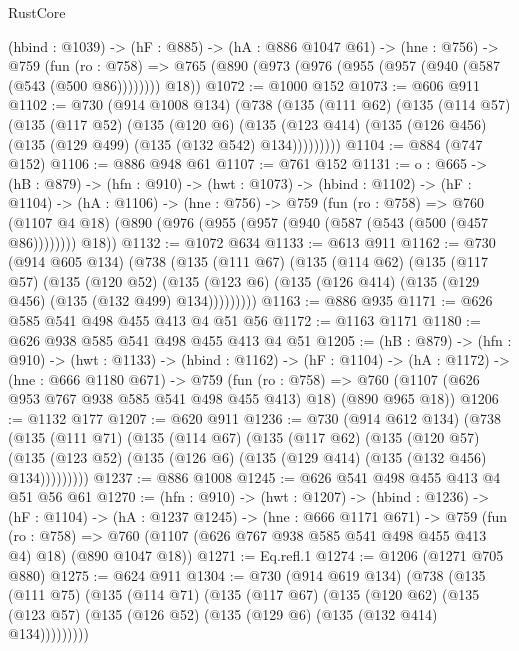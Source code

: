 \begin{lexlean}{RustCore}
\begin{coremodule}
  (hbind : @1039) ->
  (hF : @885) ->
  (hA : @886 @1047 @61) ->
  (hne : @756) ->
  @759
    (fun (ro : @758) => @765 (@890 (@973 (@976 (@955 (@957 (@940 (@587 (@543 (@500 @86)))))))) @18))
@1072 := @1000 @152
@1073 := @606 @911
@1102 := @730
    (@914 @1008 @134)
    (@738
      (@135
        (@111 @62)
        (@135
          (@114 @57)
          (@135
            (@117 @52)
            (@135
              (@120 @6)
              (@135 (@123 @414) (@135 (@126 @456) (@135 (@129 @499) (@135 (@132 @542) @134)))))))))
@1104 := @884 (@747 @152)
@1106 := @886 @948 @61
@1107 := @761 @152
@1131 := {o : @665} ->
  (hB : @879) ->
  (hfn : @910) ->
  (hwt : @1073) ->
  (hbind : @1102) ->
  (hF : @1104) ->
  (hA : @1106) ->
  (hne : @756) ->
  @759
    (fun (ro : @758) =>
    @760 (@1107 @4 @18) (@890 (@976 (@955 (@957 (@940 (@587 (@543 (@500 (@457 @86)))))))) @18))
@1132 := @1072 @634
@1133 := @613 @911
@1162 := @730
    (@914 @605 @134)
    (@738
      (@135
        (@111 @67)
        (@135
          (@114 @62)
          (@135
            (@117 @57)
            (@135
              (@120 @52)
              (@135 (@123 @6) (@135 (@126 @414) (@135 (@129 @456) (@135 (@132 @499) @134)))))))))
@1163 := @886 @935
@1171 := @626 @585 @541 @498 @455 @413 @4 @51 @56
@1172 := @1163 @1171
@1180 := @626 @938 @585 @541 @498 @455 @413 @4 @51
@1205 := (hB : @879) ->
  (hfn : @910) ->
  (hwt : @1133) ->
  (hbind : @1162) ->
  (hF : @1104) ->
  (hA : @1172) ->
  (hne : @666 @1180 @671) ->
  @759
    (fun (ro : @758) =>
    @760 (@1107 (@626 @953 @767 @938 @585 @541 @498 @455 @413) @18) (@890 @965 @18))
@1206 := @1132 @177
@1207 := @620 @911
@1236 := @730
    (@914 @612 @134)
    (@738
      (@135
        (@111 @71)
        (@135
          (@114 @67)
          (@135
            (@117 @62)
            (@135
              (@120 @57)
              (@135 (@123 @52) (@135 (@126 @6) (@135 (@129 @414) (@135 (@132 @456) @134)))))))))
@1237 := @886 @1008
@1245 := @626 @541 @498 @455 @413 @4 @51 @56 @61
@1270 := (hfn : @910) ->
  (hwt : @1207) ->
  (hbind : @1236) ->
  (hF : @1104) ->
  (hA : @1237 @1245) ->
  (hne : @666 @1171 @671) ->
  @759
    (fun (ro : @758) =>
    @760 (@1107 (@626 @767 @938 @585 @541 @498 @455 @413 @4) @18) (@890 @1047 @18))
@1271 := Eq.refl.{1}
@1274 := @1206 (@1271 @705 @880)
@1275 := @624 @911
@1304 := @730
    (@914 @619 @134)
    (@738
      (@135
        (@111 @75)
        (@135
          (@114 @71)
          (@135
            (@117 @67)
            (@135
              (@120 @62)
              (@135 (@123 @57) (@135 (@126 @52) (@135 (@129 @6) (@135 (@132 @414) @134)))))))))

\end{coremodule}
\end{lexlean}
